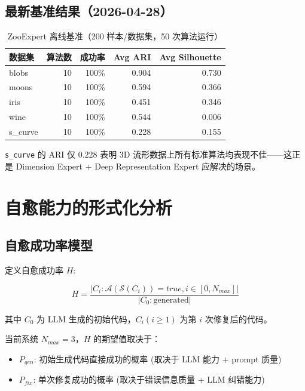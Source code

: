 \documentclass[12pt,a4paper]{article}
\begin{document}
\subsection{最新基准结果（2026-04-28）}

\begin{table}[H]
\centering
\begin{tabular}{@{}lrrrr@{}}
\toprule
\textbf{数据集} & \textbf{算法数} & \textbf{成功率} & \textbf{Avg ARI} & \textbf{Avg Silhouette} \\
\midrule
blobs & 10 & 100\% & 0.904 & 0.730 \\
moons & 10 & 100\% & 0.594 & 0.366 \\
iris  & 10 & 100\% & 0.451 & 0.346 \\
wine  & 10 & 100\% & 0.544 & 0.006 \\
s\_curve & 10 & 100\% & 0.228 & 0.155 \\
\bottomrule
\end{tabular}
\caption{ZooExpert 离线基准（200 样本/数据集，50 次算法运行）}
\end{table}

\texttt{s\_curve} 的 ARI 仅 0.228 表明 3D 流形数据上所有标准算法均表现不佳——这正是 Dimension Expert + Deep Representation Expert 应解决的场景。

\newpage

\section{自愈能力的形式化分析}

\subsection{自愈成功率模型}

定义自愈成功率 $H$:

\begin{equation}
H = \frac{|{C_i: \mathcal{A}(\mathcal{S}(C_i)) = true, i \in [0, N_{max}]}|}{|{C_0: \text{generated}}|}
\end{equation}

其中 $C_0$ 为 LLM 生成的初始代码，$C_i (i \geq 1)$ 为第 $i$ 次修复后的代码。

当前系统 $N_{max} = 3$，$H$ 的期望值取决于：
\begin{itemize}[nosep]
    \item $P_{gen}$: 初始生成代码直接成功的概率 (取决于 LLM 能力 + prompt 质量)
    \item $P_{fix}$: 单次修复成功的概率 (取决于错误信息质量 + LLM 纠错能力)
\end{itemize}
\end{document}
